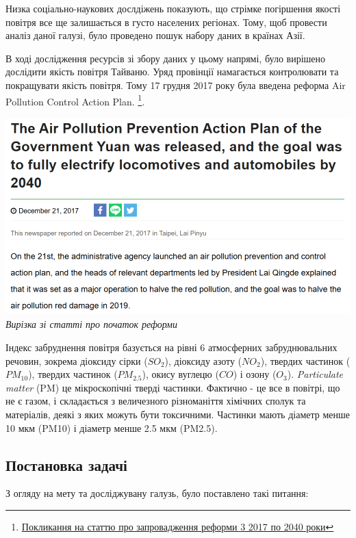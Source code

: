\documentclass{article}
\begin{document}
Низка соціально-наукових дослдіжень показують, що стрімке погіршення якості повітря все ще залишається в густо населених регіонах. Тому, щоб провести аналіз даної галузі, було проведено пошук набору даних в країнах Азії. 

В ході дослідження ресурсів зі збору даних у цьому напрямі, було вирішено дослідити якість повітря Тайваню. Уряд провінції намагається контролювати та покращувати якість повітря. Тому 17 грудня 2017 року була введена  реформа Air Pollution Control Action Plan. \footnote{\href{https://e-info.org.tw/node/209138}{Покликання на статтю про запровадження реформи 3 2017 по 2040 роки}}.

\begin{center}
    \includegraphics[height=3in]{notes/media/air_quality_reform_news.png}\\
    \textit{Вирізка зі статті про початок реформи}
\end{center}

Індекс забруднення повітря базується на рівні 6 атмосферних забруднювальних речовин, зокрема діоксиду сірки ($SO_2$), діоксиду азоту ($NO_2$), твердих частинок ($PM_{10}$), твердих частинок ($PM_{2.5}$), окису вуглецю ($CO$) і озону ($O_3$). 
\textit{Particulate matter} (PM) це мікроскопічні тверді частинки. Фактично - це все в повітрі, що не є газом, і складається з величезного різноманіття хімічних сполук та матеріалів, деякі з яких можуть бути токсичними. 
Частинки мають діаметр менше 10 мкм (PM10) і діаметр менше 2.5 мкм (PM2.5).
\subsection{Постановка задачі}
З огляду на мету та досліджувану галузь, було поставлено такі питання: 
\end{document}
